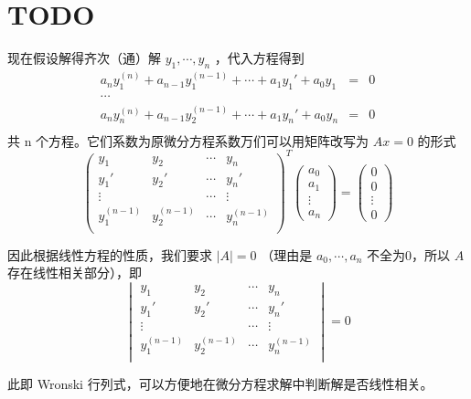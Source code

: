 \documentclass[11pt]{report}
\begin{document}
\section{{\bfseries\sffamily TODO} }
\label{sec:orgb07d29a}
现在假设解得齐次（通）解 \(y_1,\cdots,y_n\) ，代入方程得到
\begin{eqnarray*}
a_ny_{1}^{(n)}+ a_{n-1}y_{1}^{(n-1)}+\cdots+a_1y_{1}'+a_0y_{1} & = & 0 \nonumber\\
\cdots\\
a_ny_{n}^{(n)}+ a_{n-1}y_{2}^{(n-1)}+\cdots+a_1y_{n}'+a_{0}y_{n} & = & 0 \nonumber\\
\end{eqnarray*}
共 n 个方程。它们系数为原微分方程系数万们可以用矩阵改写为 \(Ax=0\) 的形式
\begin{equation}
\label{eq:4}
\begin{pmatrix}
y_1&y_2&\cdots&y_n\\
y_1'&y_2'&\cdots&y_n'\\
\vdots&&\cdots&\vdots\\
y^{(n-1)}_1&y^{(n-1)}_2&\cdots&y^{(n-1)}_n\\
\end{pmatrix}^T
\begin{pmatrix}
a_0\\a_1\\\vdots\\a_n
\end{pmatrix}
=
\begin{pmatrix}
0\\0\\\vdots\\0
\end{pmatrix}
\end{equation}

因此根据线性方程的性质，我们要求 \(|A|=0\) （理由是 \(a_0,\cdots,a_n\) 不全为0，所以 \(A\) 存在线性相关部分），即
\begin{equation}
\label{eq:wronski=0}
\begin{vmatrix}
y_1&y_2&\cdots&y_n\\
y_1'&y_2'&\cdots&y_n'\\
\vdots&&\cdots&\vdots\\
y^{(n-1)}_1&y^{(n-1)}_2&\cdots&y^{(n-1)}_n\\
\end{vmatrix}
=0
\end{equation}

此即 Wronski 行列式，可以方便地在微分方程求解中判断解是否线性相关。
\end{document}
